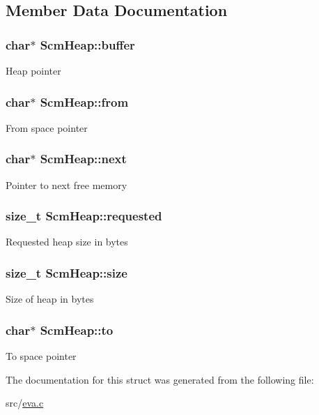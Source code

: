 \subsection{Member Data Documentation}
\hypertarget{struct_scm_heap_a5ff49e3bcbe9bc4bd659a7d1b3414606}{
\subsubsection[{buffer}]{\setlength{\rightskip}{0pt plus 5cm}char$\ast$ Scm\-Heap\-::buffer}}\label{struct_scm_heap_a5ff49e3bcbe9bc4bd659a7d1b3414606}
Heap pointer \hypertarget{struct_scm_heap_abde3e0112b373c0cdf614749603b953d}{
\subsubsection[{from}]{\setlength{\rightskip}{0pt plus 5cm}char$\ast$ Scm\-Heap\-::from}}\label{struct_scm_heap_abde3e0112b373c0cdf614749603b953d}
From space pointer \hypertarget{struct_scm_heap_a71601a799b087f170926858907c84b9a}{
\subsubsection[{next}]{\setlength{\rightskip}{0pt plus 5cm}char$\ast$ Scm\-Heap\-::next}}\label{struct_scm_heap_a71601a799b087f170926858907c84b9a}
Pointer to next free memory \hypertarget{struct_scm_heap_a7daedc58f94d96335b57d39d604042bf}{
\subsubsection[{requested}]{\setlength{\rightskip}{0pt plus 5cm}size\-\_\-t Scm\-Heap\-::requested}}\label{struct_scm_heap_a7daedc58f94d96335b57d39d604042bf}
Requested heap size in bytes \hypertarget{struct_scm_heap_a4fa4d11ee8b944bbad916007ff2a1f5a}{
\subsubsection[{size}]{\setlength{\rightskip}{0pt plus 5cm}size\-\_\-t Scm\-Heap\-::size}}\label{struct_scm_heap_a4fa4d11ee8b944bbad916007ff2a1f5a}
Size of heap in bytes \hypertarget{struct_scm_heap_a3ca35961c6693ea9b5c19d2c2420caba}{
\subsubsection[{to}]{\setlength{\rightskip}{0pt plus 5cm}char$\ast$ Scm\-Heap\-::to}}\label{struct_scm_heap_a3ca35961c6693ea9b5c19d2c2420caba}
To space pointer 

The documentation for this struct was generated from the following file\-:\begin{DoxyCompactItemize}
\item 
src/\hyperlink{eva_8c}{eva.\-c}\end{DoxyCompactItemize}
